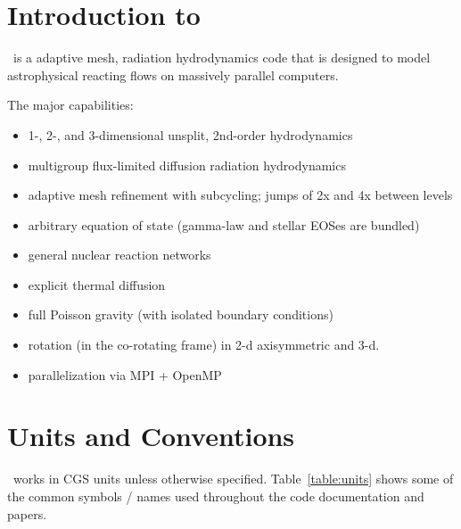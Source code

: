 \section{Introduction to \castro}

\castro\ is a adaptive mesh, radiation hydrodynamics code that is
designed to model astrophysical reacting flows on massively parallel
computers.

The major capabilities:
\begin{itemize}
\item 1-, 2-, and 3-dimensional unsplit, 2nd-order hydrodynamics
\item multigroup flux-limited diffusion radiation hydrodynamics
\item adaptive mesh refinement with subcycling; jumps of 2x and 4x between levels
\item arbitrary equation of state (gamma-law and stellar EOSes are bundled)
\item general nuclear reaction networks
\item explicit thermal diffusion
\item full Poisson gravity (with isolated boundary conditions)
\item rotation (in the co-rotating frame) in 2-d axisymmetric and 3-d.
\item parallelization via MPI + OpenMP
\end{itemize}



\section{Units and Conventions}

\castro\ works in CGS units unless otherwise specified.
Table~\ref{table:units} shows some of the common symbols / names used
throughout the code documentation and papers.

